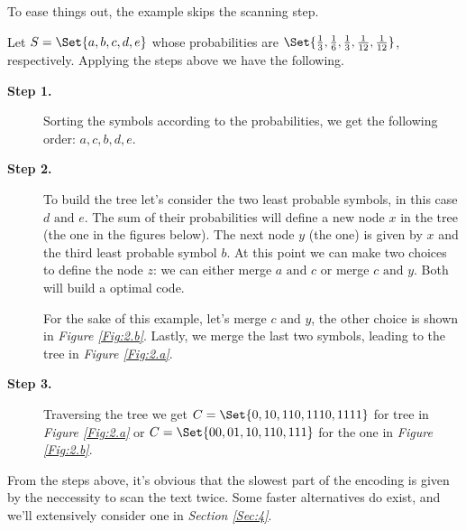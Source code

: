 \documentclass{subfiles}
\begin{document}
        \begin{example*}
            To ease things out, the example skips the scanning step.

            Let \(S = \Set{a, b, c, d, e}\) whose probabilities are
            \(\Set{\tfrac{1}{3}, \tfrac{1}{6}, \tfrac{1}{3},
            \tfrac{1}{12}, \tfrac{1}{12}}\), respectively. 
            Applying the steps above we have the following.
            \begin{description}
                \item [\textbf{Step 1.}] 
                    Sorting the symbols according to the probabilities,
                    we get the following order: \(a, c, b, d, e\).

                \item [\textbf{Step 2.}] 
                    To build the tree let's consider the 
                    two least probable symbols, in this case \(d \text{ and } e\).
                    The sum of their probabilities will define a new node \(x\) in the
                    tree (the  one in the figures below).
                    The next node \(y\) (the  one) is given by \(x\) 
                    and the third least probable symbol \(b\).
                    At this point we can make two choices to define the node \(z\):
                    we can either merge \(a \text{ and } c\) or merge \(c \text{ and } y\).
                    Both will build a optimal code. 
                    
                    For the sake of this example, let's merge \(c \text{ and } y\),
                    the other choice is shown in \emph{Figure \ref{Fig:2.b}}.
                    Lastly, we merge the last two symbols, 
                    leading to the tree in \emph{Figure \ref{Fig:2.a}}.
                    

                \item [\textbf{Step 3.}] Traversing the tree we get 
                    \(C = \Set{0, 10, 110, 1110, 1111}\) for tree in 
                    \emph{Figure \ref{Fig:2.a}} or \(C = \Set{00, 01, 10, 110, 111}\)
                    for the one in \emph{Figure \ref{Fig:2.b}}.
            \end{description}   
        \end{example*}

        From the steps above, it's obvious that the slowest part of the encoding
        is given by the neccessity to scan the text twice. 
        Some faster alternatives do exist, and we'll extensively consider one in 
        \emph{Section \ref{Sec:4}}.
\end{document}
